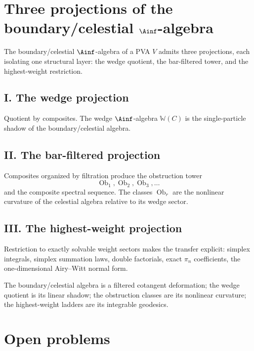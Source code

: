 \section{Three projections of the boundary/celestial $\Ainf$-algebra}
\label{sec:cbt-synthesis}

The boundary/celestial $\Ainf$-algebra of a PVA $V$ admits three projections, each isolating one structural layer: the wedge quotient, the bar-filtered tower, and the highest-weight restriction.

\subsection*{I. The wedge projection}
Quotient by composites. The wedge $\Ainf$-algebra $\mathbb{W}(C)$ is the single-particle shadow of the boundary/celestial algebra.

\subsection*{II. The bar-filtered projection}
Composites organized by filtration produce the obstruction tower
\[
\operatorname{Ob}_1,\operatorname{Ob}_2,\operatorname{Ob}_3,\dots
\]
and the composite spectral sequence. The classes $\operatorname{Ob}_r$ are the nonlinear curvature of the celestial algebra relative to its wedge sector.

\subsection*{III. The highest-weight projection}
Restriction to exactly solvable weight sectors makes the transfer explicit: simplex integrals, simplex summation laws, double factorials, exact $\pi_n$ coefficients, the one-dimensional Airy--Witt normal form.

The boundary/celestial algebra is a filtered cotangent deformation; the wedge quotient is its linear shadow; the obstruction classes are its nonlinear curvature; the highest-weight ladders are its integrable geodesics.

\section{Open problems}
\label{sec:cbt-open-problems}

